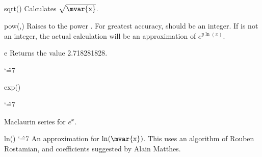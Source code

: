 \begin{math-function}{sqrt()}
\mathcommand
    Calculates $\sqrt{\textrm{\mvar{x}}}$.
\begin{codeexample}[]
 \pgfmathresult
\end{codeexample}

\begin{codeexample}[]
 \pgfmathresult
\end{codeexample}
\end{math-function}

\begin{math-function}{pow(,)}
\mathcommand
    Raises  to the power . For greatest accuracy, 
    should be an integer. If  is not an integer, the actual calculation
    will be an approximation of $e^{y \ln(x)}$.
\begin{codeexample}[]
 \pgfmathresult
\end{codeexample}
\end{math-function}

\begin{math-function}{e}
\mathcommand
    Returns the value 2.718281828.
{
\catcode`\^=7
\begin{codeexample}[]
 \pgfmathresult
\end{codeexample}
}
\end{math-function}

\begin{math-function}{exp()}
\mathcommand
{ \catcode`\^=7

    Maclaurin series for $e^x$.
}
\begin{codeexample}[]
 \pgfmathresult
\end{codeexample}

\begin{codeexample}[]
 \pgfmathresult
\end{codeexample}
\end{math-function}

\begin{math-function}{ln()}
\mathcommand
{ \catcode`\^=7
    An approximation for $\ln(\textrm{\mvar{x}})$. This uses an algorithm of
    Rouben Rostamian, and coefficients suggested by Alain Matthes.
}
\begin{codeexample}[]
 \pgfmathresult
\end{codeexample}

\begin{codeexample}[]
 \pgfmathresult
\end{codeexample}
\end{math-function}

